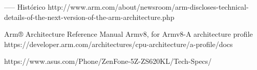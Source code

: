 
----- Histórico
http://www.arm.com/about/newsroom/arm-discloses-technical-details-of-the-next-version-of-the-arm-architecture.php

Arm® Architecture Reference Manual Armv8, for Armv8-A architecture profile
https://developer.arm.com/architectures/cpu-architecture/a-profile/docs

https://www.asus.com/Phone/ZenFone-5Z-ZS620KL/Tech-Specs/
